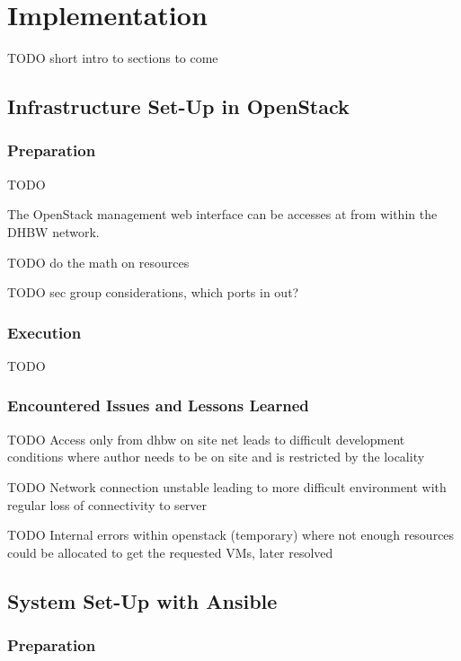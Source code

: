 \chapter{Implementation}
\label{chap:impl}

TODO short intro to sections to come

\section{Infrastructure Set-Up in OpenStack}

\subsection{Preparation}

TODO

    The OpenStack management web interface can be accesses at  from within the \ac{DHBW} network. 


TODO do the math on resources

TODO sec group considerations, which ports in out?




\subsection{Execution}

TODO

\subsection{Encountered Issues and Lessons Learned}

TODO Access only from dhbw on site net leads to difficult development conditions where author needs to be on site and is restricted by the locality

TODO Network connection unstable leading to more difficult environment with regular loss of connectivity to server

TODO Internal errors within openstack (temporary) where not enough resources could be allocated to get the requested VMs, later resolved


\section{System Set-Up with Ansible}

\subsection{Preparation}

